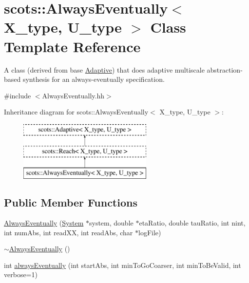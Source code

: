 \hypertarget{classscots_1_1AlwaysEventually}{}\section{scots\+:\+:Always\+Eventually$<$ X\+\_\+type, U\+\_\+type $>$ Class Template Reference}
\label{classscots_1_1AlwaysEventually}


A class (derived from base \hyperlink{classscots_1_1Adaptive}{Adaptive}) that does adaptive multiscale abstraction-\/based synthesis for an always-\/eventually specification.  




{\ttfamily \#include $<$Always\+Eventually.\+hh$>$}

Inheritance diagram for scots\+:\+:Always\+Eventually$<$ X\+\_\+type, U\+\_\+type $>$\+:\begin{figure}[H]
\begin{center}
\leavevmode
\includegraphics[height=3.000000cm]{classscots_1_1AlwaysEventually}
\end{center}
\end{figure}
\subsection*{Public Member Functions}
\begin{DoxyCompactItemize}
\item 
\hyperlink{classscots_1_1AlwaysEventually_a7d9f12e625ead9e0cbd0787a9e7d786e}{Always\+Eventually} (\hyperlink{classscots_1_1System}{System} $\ast$system, double $\ast$eta\+Ratio, double tau\+Ratio, int nint, int num\+Abs, int read\+XX, int read\+Abs, char $\ast$log\+File)
\item 
\hyperlink{classscots_1_1AlwaysEventually_aa3d060f750bf82b5a41afdf7d925c3bb}{$\sim$\+Always\+Eventually} ()
\item 
int \hyperlink{classscots_1_1AlwaysEventually_a2428c979a09a3aa7efeed53059098bbc}{always\+Eventually} (int start\+Abs, int min\+To\+Go\+Coarser, int min\+To\+Be\+Valid, int verbose=1)
\end{DoxyCompactItemize}
